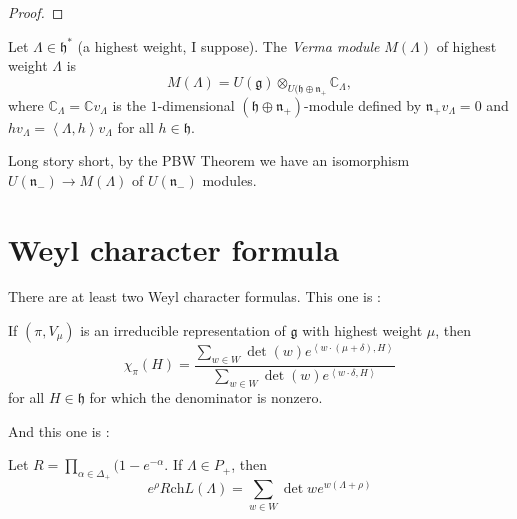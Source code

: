 \begin{proof}

\end{proof}

\begin{definition}
\label{definition-Verma-module}
\begin{reference}
\cite[Definition 4.1]{jethro-rt}
\end{reference}
Let $\Lambda \in \mathfrak{h}^*$
(a highest weight, I suppose).
The {\it Verma module} $M(\Lambda)$
of highest weight $\Lambda$ is
$$
M(\Lambda)=U(\mathfrak{g})
\otimes_{U(\mathfrak{h}\oplus
\mathfrak{n}_+}
\mathbb{C}_\Lambda,
$$
where
$\mathbb{C}_\Lambda=\mathbb{C}v_\Lambda$
is the $1$-dimensional $(\mathfrak{h} \oplus
\mathfrak{n}_+)$-module
defined by $\mathfrak{n}_+v_\Lambda=0$
and
$hv_\Lambda=\left\langle{}\Lambda,h\right\rangle{}v_\Lambda$
for all $h \in \mathfrak{h}$.
\end{definition}

Long story short, by the PBW Theorem we
have an isomorphism $U(\mathfrak{n}_-) \to
M(\Lambda)$
of $U(\mathfrak{n}_-)$ modules.

\section{Weyl character formula}
\label{section-Weyl-character-formula}

There are at least two Weyl character
formulas.
This one is \cite[Theorem 10.14]{Hall}:

\begin{theorem}
\label{theorem-Weyl-character-formula-Hall}
If $(\pi,V_\mu)$ is an irreducible
representation of
$\mathfrak{g}$ with highest weight $\mu$,
then
\begin{equation}
\label{equation-Weyl-character-formula-Hall}
\chi_\pi(H)=\frac{\sum_{w \in
W}\det(w)e^{\left\langle{}w\cdot(\mu+\delta),
H\right\rangle{}}}
{\sum_{w \in W}\det(w)e^{\left\langle{}w\cdot
\delta,H\right\rangle{}}}
\end{equation}
for all $H \in \mathfrak{h}$ for which the
denominator is nonzero.
\end{theorem}

And this one is \cite[Theorem 25.3]{KLAL}:

\begin{theorem}
\label{theorem-Weyl-character-formula-KLAL}
Let $R=\prod_{\alpha \in
\Delta_+}(1-e^{-\alpha}$.
If  $\Lambda \in P_+$, then
\begin{equation}
\label{equation-Weyl-character-formula-KLAL}
e^{\rho}R \text{ch}L(\Lambda)=\sum_{w \in
W}\det w e^{w(\Lambda+\rho)}
\end{equation}
\end{theorem}

